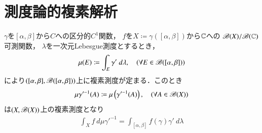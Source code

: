 \section{測度論的複素解析}
	$\gamma$を$[\alpha,\beta]$から$C$への区分的$C^1$関数，
	$f$を$X \coloneqq \gamma([\alpha,\beta])$から$\mathbb{C}$への
	$\mathscr{B}(X)/\mathscr{B}(\mathbb{C})$可測関数，
	$\lambda$を一次元Lebesgue測度とするとき，
	\begin{align}
		\mu(E) \coloneqq \int_E \gamma'\ d\lambda,
		\quad (\forall E \in \mathscr{B}([\alpha,\beta]))
	\end{align}
	により$([\alpha,\beta],\mathscr{B}([\alpha,\beta]))$上に複素測度が定まる．このとき
	\begin{align}
		\mu \gamma'^{-1}(A) \coloneqq \mu\left( \gamma'^{-1}(A) \right),
		\quad (\forall A \in \mathscr{B}(X))
	\end{align}
	は$(X,\mathscr{B}(X))$上の複素測度となり
	\begin{align}
		\int_X f\ d\mu \gamma'^{-1} = \int_{[\alpha,\beta]} f(\gamma) \gamma'\ d\lambda
	\end{align}